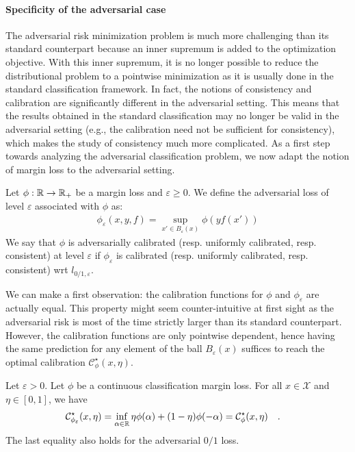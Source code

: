\paragraph{Specificity of the adversarial case}
The adversarial risk minimization problem is much more challenging than its standard counterpart because an inner supremum is added to the optimization objective. With this inner supremum, it is no longer possible to reduce the distributional problem to a pointwise minimization as it is usually done in the standard classification framework. In fact, the notions of consistency and calibration are significantly different in the adversarial setting. This means that the results obtained in the standard classification may no longer be valid in the adversarial setting (e.g., the calibration need not be sufficient for consistency), which makes the study of consistency much more complicated. As a first step towards analyzing the adversarial classification problem, we now adapt the notion of margin loss to the adversarial setting.

\begin{definition}
Let $\phi:\mathbb{R}\to\mathbb{R}_+$ be a margin loss and $\varepsilon\geq0$. We define the adversarial loss of level $\varepsilon$ associated with $\phi$ as:
\begin{align*}
    \phi_\varepsilon(x,y,f) = \sup_{x'\in B_\varepsilon(x)} \phi(yf(x'))
\end{align*}
We say that $\phi$ is adversarially calibrated (resp. uniformly calibrated, resp. consistent) at level $\varepsilon$ if $\phi_\varepsilon$ is calibrated (resp. uniformly calibrated, resp. consistent) wrt $l_{0/1,\varepsilon}$.
\end{definition}




We can make a first observation: the calibration functions for $\phi$ and $\phi_\varepsilon$ are actually equal. This property might seem counter-intuitive at first sight as the adversarial risk is most of the time strictly larger than its standard counterpart. However, the calibration functions are only pointwise dependent, hence having the same prediction for any element of the ball $B_\varepsilon(x)$ suffices to reach the optimal calibration $\mathcal{C}^\star_\phi(x,\eta)$.



\begin{prop}
\label{prop:calib-equality}
Let $\varepsilon>0$. Let $\phi$ be a continuous classification margin loss.  For all $x\in\mathcal{X}$ and $\eta\in[0,1]$, we have
\begin{align*}
    \mathcal{C}^\star_{\phi_\varepsilon}(x,\eta)&= \inf_{\alpha\in\mathbb{R}}\eta \phi(\alpha)+(1-\eta)\phi(-\alpha)
    =\mathcal{C}^\star_\phi(x,\eta)\quad.
\end{align*}
The last equality also holds for the adversarial $0/1$ loss.
\end{prop}

